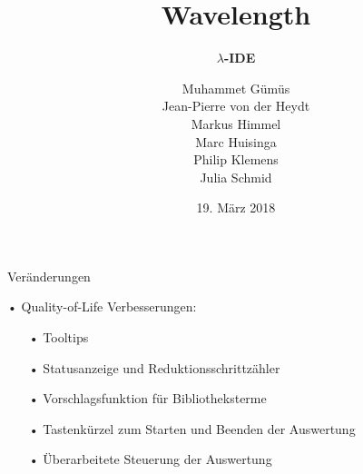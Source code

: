 \documentclass[10pt]{beamer}
\title[] %
{ %
      \textbf{Wavelength}
}
\subtitle[$\lambda$-IDE]
{
      \textbf{$\lambda$-IDE}
}
\author[wavelength]
{     
      Muhammet Gümüs \\
      Jean-Pierre von der Heydt \\  
       Markus Himmel \\
       Marc Huisinga \\
       Philip Klemens \\ 
       Julia Schmid   }
\institute[]
{
      
  
}
\date{19. März 2018}
\begin{document}

{
\begin{frame}[plain]
\maketitle
\end{frame}
}

\begin{frame}{Veränderungen}
	\item[•] Quality-of-Life Verbesserungen:
	\begin{itemize}
		\item[•] Tooltips
		\item[•] Statusanzeige und Reduktionsschrittzähler
		\item[•] Vorschlagsfunktion für Bibliotheksterme
		\item[•] Tastenkürzel zum Starten und Beenden der Auswertung
		\item[•] Überarbeitete Steuerung der Auswertung
	\end{itemize}
\end{frame}
\end{document}
